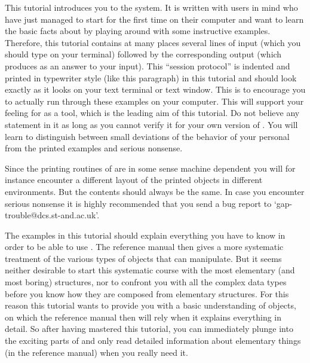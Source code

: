 


This tutorial introduces you to  the {\GAP}  system.  It is written  with
users in mind who have just managed to start {\GAP} for the first time on
their computer and want to learn the basic facts  about {\GAP} by playing
around with some instructive  examples. Therefore, this tutorial contains
at many  places several lines of  input  (which you  should type  on your
terminal) followed by the corresponding output  (which {\GAP} produces as
an answer to your input).
\begintt
    This ``session protocol'' is indented and printed in typewriter style
    (like this paragraph) in this tutorial and should look exactly as it
    looks on your text terminal or text window.
\endtt
This is  to encourage you to actually  run through these examples on your
computer. This will support your  feeling for {\GAP}  as a tool, which is
the leading aim of this  tutorial. Do not believe any  statement in it as
long  as you cannot verify  it for your own  version of  {\GAP}. You will
learn to distinguish  between small  deviations of  the behavior of  your
personal {\GAP} from the printed examples and serious nonsense.

Since the printing routines of {\GAP} are in some sense machine dependent
you will for instance encounter a different layout of the printed objects
in different environments.  But the  contents should always be the  same.
In case you encounter serious nonsense  it is highly recommended that you
send a bug report to `gap-trouble@dcs.st-and.ac.uk'.

The examples in this tutorial should  explain everything you have to know
in order to be able to use {\GAP}. The reference manual then gives a more
systematic  treatment of  the various types  of objects  that  {\GAP} can
manipulate.  But it  seems neither  desirable   to start this  systematic
course with  the  most elementary (and most   boring) structures, nor  to
confront you with all the complex data types before you know how they are
composed from elementary structures. For this reason
this tutorial wants to  provide you with a  basic understanding of {\GAP}
objects, on  which the reference manual  then will rely when  it explains
everything in detail.  So  after having mastered  this tutorial, you  can
immediately  plunge   into the exciting  parts  of  {\GAP} and  only read
detailed information about elementary   things (in the reference  manual)
when you really need it.

